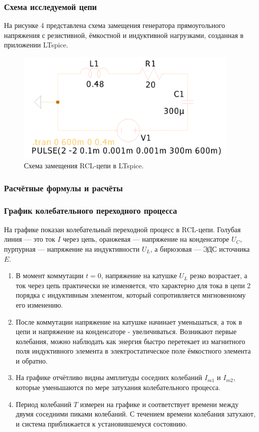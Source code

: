 \subsubsection{Схема исследуемой цепи}
На рисунке 4 представлена схема замещения генератора прямоугольного напряжения с резистивной, ёмкостной и индуктивной нагрузками, созданная в приложении LTspice.

\begin{figure}[H]
	\centering
	\includegraphics[width=0.96\textwidth]{./data/rcl_2-schema.png}
	\caption{Схема замещения RCL-цепи в LTspice.}
\end{figure}

\subsubsection{Расчётные формулы и расчёты}


\subsubsection{График колебательного переходного процесса}
На графике показан колебательный переходной процесс в RCL-цепи. Голубая линия — это ток \( I \) через цепь, оранжевая — напряжение на конденсаторе \( U_C \), пурпурная — напряжение на индуктивности \( U_L \), а бирюзовая — ЭДС источника \( E \).

\begin{enumerate}[noitemsep,topsep=0pt,left=6pt,label=\arabic*.]
	\item В момент коммутации \( t = 0 \), напряжение на катушке \( U_L \) резко возрастает, а ток через цепь практически не изменяется, что характерно для тока в цепи 2 порядка с индуктивным элементом, который сопротивляется мнгновенному его изменению.
	\item После коммутации напряжение на катушке начинает уменьшаться, а ток в цепи и напряжение на конденсаторе - увеличиваться. Возникают первые колебания, можно наблюдать как энергия быстро перетекает из магнитного поля индуктивного элемента в электростатическое поле ёмкостного элемента и обратно.
	\item На графике отчётливо видны амплитуды соседних колебаний \( I_{m1} \) и \( I_{m2} \), которые уменьшаются по мере затухания колебательного процесса.
	\item Период колебаний \( T \) измерен на графике и соответствует времени между двумя соседними пиками колебаний. С течением времени колебания затухают, и система приближается к установившемуся состоянию.
\end{enumerate}


